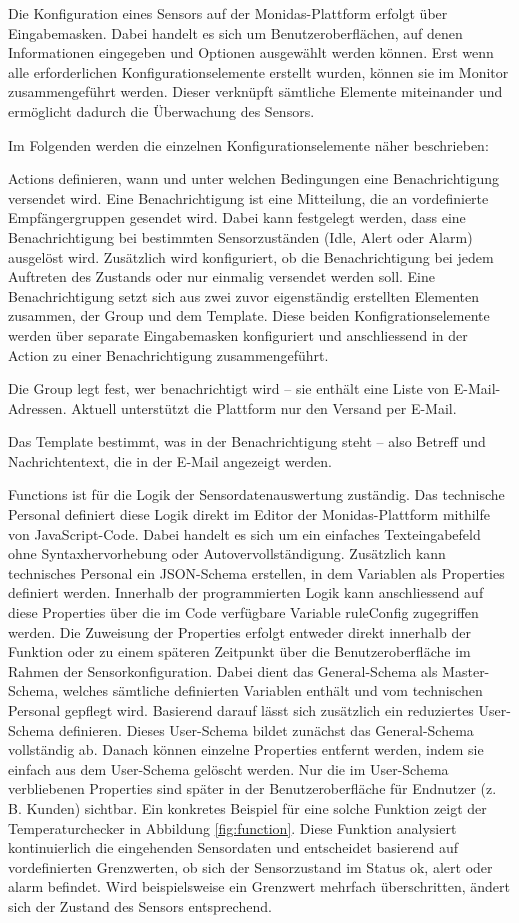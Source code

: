 Die Konfiguration eines Sensors auf der Monidas-Plattform erfolgt über Eingabemasken. Dabei handelt es sich um Benutzeroberflächen, auf denen Informationen eingegeben und Optionen ausgewählt werden können. Erst wenn alle erforderlichen Konfigurationselemente erstellt wurden, können sie im Monitor zusammengeführt werden. Dieser verknüpft sämtliche Elemente miteinander und ermöglicht dadurch die Überwachung des Sensors.

Im Folgenden werden die einzelnen Konfigurationselemente näher beschrieben:

Actions definieren, wann und unter welchen Bedingungen eine Benachrichtigung versendet wird. Eine Benachrichtigung ist eine Mitteilung, die an vordefinierte Empfängergruppen gesendet wird. Dabei kann festgelegt werden, dass eine Benachrichtigung bei bestimmten Sensorzuständen (Idle, Alert oder Alarm) ausgelöst wird. Zusätzlich wird konfiguriert, ob die Benachrichtigung bei jedem Auftreten des Zustands oder nur einmalig versendet werden soll. Eine Benachrichtigung setzt sich aus zwei zuvor eigenständig erstellten Elementen zusammen, der Group und dem Template. Diese beiden Konfigrationselemente werden über separate Eingabemasken konfiguriert und anschliessend in der Action zu einer Benachrichtigung zusammengeführt.

Die Group legt fest, wer benachrichtigt wird – sie enthält eine Liste von E-Mail-Adressen. Aktuell unterstützt die Plattform nur den Versand per E-Mail.

Das Template bestimmt, was in der Benachrichtigung steht – also Betreff und Nachrichtentext, die in der E-Mail angezeigt werden.

Functions ist für die Logik der Sensordatenauswertung zuständig. Das technische Personal definiert diese Logik direkt im Editor der Monidas-Plattform mithilfe von JavaScript-Code. Dabei handelt es sich um ein einfaches Texteingabefeld ohne Syntaxhervorhebung oder Autovervollständigung. Zusätzlich kann technisches Personal ein JSON-Schema erstellen, in dem Variablen als Properties definiert werden. Innerhalb der programmierten Logik kann anschliessend auf diese Properties über die im Code verfügbare Variable ruleConfig zugegriffen werden. Die Zuweisung der Properties erfolgt entweder direkt innerhalb der Funktion oder zu einem späteren Zeitpunkt über die Benutzeroberfläche im Rahmen der Sensorkonfiguration. Dabei dient das General-Schema als Master-Schema, welches sämtliche definierten Variablen enthält und vom technischen Personal gepflegt wird. Basierend darauf lässt sich zusätzlich ein reduziertes User-Schema definieren. Dieses User-Schema bildet zunächst das General-Schema vollständig ab. Danach können einzelne Properties entfernt werden, indem sie einfach aus dem User-Schema gelöscht werden. Nur die im User-Schema verbliebenen Properties sind später in der Benutzeroberfläche für Endnutzer (z. B. Kunden) sichtbar. Ein konkretes Beispiel für eine solche Funktion zeigt der Temperaturchecker in Abbildung \ref{fig:function}. Diese Funktion analysiert kontinuierlich die eingehenden Sensordaten und entscheidet basierend auf vordefinierten Grenzwerten, ob sich der Sensorzustand im Status ok, alert oder alarm befindet. Wird beispielsweise ein Grenzwert mehrfach überschritten, ändert sich der Zustand des Sensors entsprechend.

